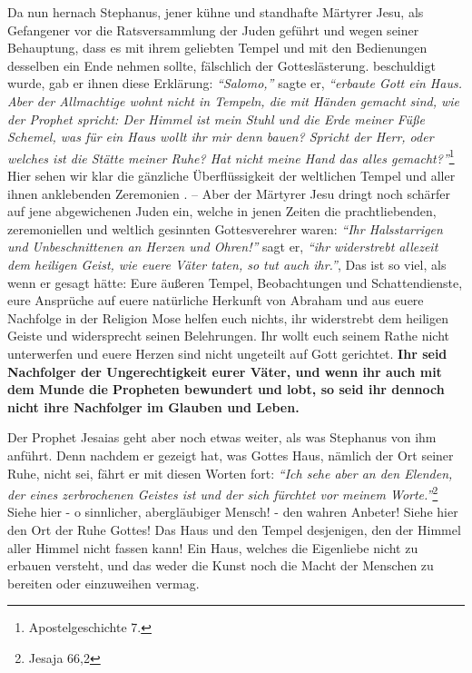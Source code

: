   
Da nun hernach Stephanus, jener kühne und standhafte Märtyrer Jesu, als
Gefangener vor die Ratsversammlung der Juden geführt und wegen seiner
Behauptung, dass es mit ihrem geliebten Tempel und mit den Bedienungen desselben
ein Ende nehmen sollte, fälschlich der Gotteslästerung.
beschuldigt wurde, gab
er ihnen diese Erklärung:
\textit{"`Salomo,"'}  sagte er,
\textit{"`erbaute Gott ein Haus. Aber der Allmachtige wohnt nicht in Tempeln,
die mit Händen gemacht sind, wie der Prophet spricht: Der Himmel ist mein Stuhl
und die Erde meiner Füße Schemel, was für ein Haus wollt ihr mir denn bauen?
Spricht der Herr, oder welches ist die Stätte meiner Ruhe? Hat nicht meine Hand
das alles gemacht?"'}\footnote{Apostelgeschichte 7.}
Hier sehen wir klar die gänzliche Überflüssigkeit der weltlichen
Tempel und aller ihnen anklebenden Zeremonien . -- Aber der
Märtyrer Jesu  dringt
noch schärfer auf jene abgewichenen Juden 
ein, welche in jenen Zeiten die
prachtliebenden, zeremoniellen und weltlich gesinnten Gottesverehrer waren:
\textit{"`Ihr Halsstarrigen und Unbeschnittenen an Herzen und Ohren!"'} sagt er,
\textit{"`ihr widerstrebt allezeit dem heiligen Geist, wie euere Väter taten,
so tut auch
ihr."'}, Das ist so viel, als wenn er gesagt hätte: Eure äußeren Tempel,
Beobachtungen und Schattendienste, eure Ansprüche auf euere natürliche Herkunft
von Abraham  und aus euere Nachfolge in der Religion
Mose  helfen euch nichts,
ihr widerstrebt dem heiligen Geiste und widersprecht seinen Belehrungen. Ihr
wollt euch seinem Rathe nicht unterwerfen und euere Herzen sind nicht ungeteilt
auf Gott gerichtet. \label{ref:05_05_wahre_nachfolge}
\textbf{Ihr seid Nachfolger der Ungerechtigkeit eurer Väter, und
wenn ihr auch mit dem Munde die Propheten bewundert und lobt, so seid ihr
dennoch nicht ihre Nachfolger im Glauben und Leben.} 

\medskip

Der Prophet Jesaias  geht aber noch etwas weiter, als
was Stephanus von ihm
anführt. Denn nachdem er gezeigt hat, was Gottes Haus, nämlich der Ort seiner
Ruhe, nicht sei, fährt er mit diesen Worten fort:
\textit{"`Ich sehe aber an den Elenden, der eines zerbrochenen Geistes ist und
der sich fürchtet vor meinem Worte."'}\footnote{Jesaja 66,2}
Siehe hier - o sinnlicher, abergläubiger Mensch! - den
wahren Anbeter! Siehe hier den Ort der Ruhe Gottes! Das Haus und den Tempel
desjenigen, den der Himmel aller Himmel nicht fassen kann! Ein Haus, welches
die Eigenliebe nicht zu erbauen versteht, und das weder die Kunst noch die Macht
der Menschen zu bereiten oder einzuweihen vermag.

